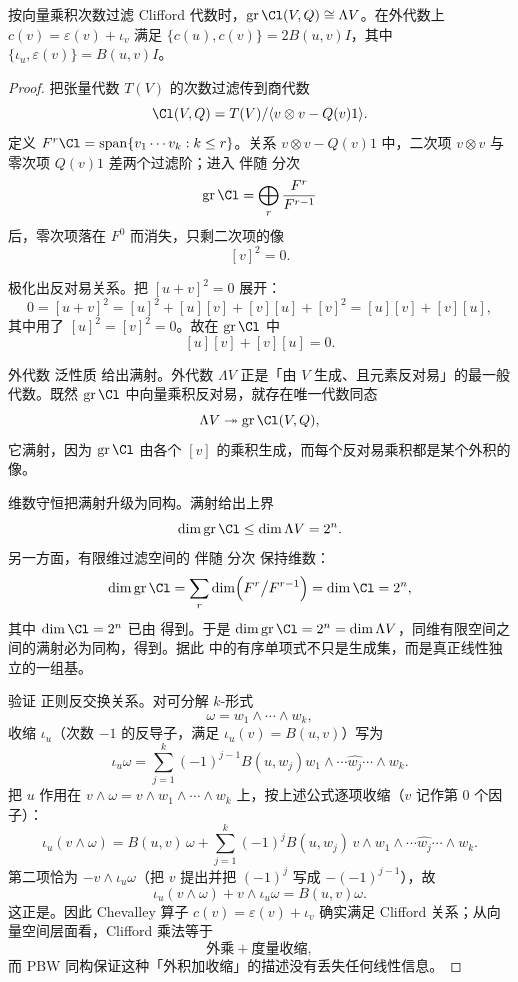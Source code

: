 \begin{theorem}
按向量乘积次数过滤 Clifford 代数时，$\operatorname{gr}\Cl(V,Q)\cong\Lambda V$。在外代数上 $c(v)=\varepsilon(v)+\iota_v$ 满足 $\{c(u),c(v)\}=2B(u,v)I$，其中 $\{\iota_u,\varepsilon(v)\}=B(u,v)I$。
\end{theorem}
\begin{proof}
把张量代数 $T(V)$ 的次数过滤传到商代数
\[
\Cl(V,Q)
=T(V)/\langle v\otimes v-Q(v)1\rangle.
\]
定义 $F^r\Cl=\operatorname{span}\{v_1\cdots v_k:k\le r\}$。关系 $v\otimes v-Q(v)1$ 中，二次项 $v\otimes v$ 与零次项 $Q(v)1$ 差两个过滤阶；进入 伴随 分次
\[
\operatorname{gr}\Cl=\bigoplus_{r}\frac{F^r}{F^{r-1}}
\]
后，零次项落在 $F^0$ 而消失，只剩二次项的像
\[
[v]^2=0.
\]

极化出反对易关系。把 $[u+v]^2=0$ 展开：
\begin{equation*}
  0=[u+v]^2
  =[u]^2+[u][v]+[v][u]+[v]^2
  =[u][v]+[v][u],
\end{equation*}
其中用了 $[u]^2=[v]^2=0$。故在 $\operatorname{gr}\Cl$ 中
\[
[u][v]+[v][u]=0.
\]

外代数 泛性质 给出满射。外代数 $\Lambda V$ 正是「由 $V$ 生成、且元素反对易」的最一般代数。既然 $\operatorname{gr}\Cl$ 中向量乘积反对易，就存在唯一代数同态
\[
\Lambda V\twoheadrightarrow
\operatorname{gr}\Cl(V,Q),
\]
它满射，因为 $\operatorname{gr}\Cl$ 由各个 $[v]$ 的乘积生成，而每个反对易乘积都是某个外积的像。

维数守恒把满射升级为同构。满射给出上界
\[
\dim\operatorname{gr}\Cl
\le\dim\Lambda V=2^n.
\]
另一方面，有限维过滤空间的 伴随 分次 保持维数：
\[
\dim\operatorname{gr}\Cl
=\sum_r\dim\Bigl(F^r\big/F^{r-1}\Bigr)
=\dim\Cl=2^n,
\]
其中 $\dim\Cl=2^n$ 已由 得到。于是 $\dim\operatorname{gr}\Cl=2^n=\dim\Lambda V$，同维有限空间之间的满射必为同构，得到。据此 中的有序单项式不只是生成集，而是真正线性独立的一组基。

验证 正则反交换关系。对可分解 $k$-形式
\[
\omega=w_1\wedge\cdots\wedge w_k,
\]
收缩 $\iota_u$（次数 $-1$ 的反导子，满足 $\iota_u(v)=B(u,v)$）写为
\[
\iota_u\omega
=\sum_{j=1}^k(-1)^{j-1}B(u,w_j)
 w_1\wedge\cdots\widehat{w_j}\cdots\wedge w_k.
\]
把 $u$ 作用在 $v\wedge\omega=v\wedge w_1\wedge\cdots\wedge w_k$ 上，按上述公式逐项收缩（$v$ 记作第 $0$ 个因子）：
\begin{equation*}
 \iota_u(v\wedge\omega)
 =B(u,v)\,\omega
 +\sum_{j=1}^{k}(-1)^{j}B(u,w_j)\,v\wedge w_1\wedge\cdots\widehat{w_j}\cdots\wedge w_k.
\end{equation*}
第二项恰为 $-v\wedge\iota_u\omega$（把 $v$ 提出并把 $(-1)^j$ 写成 $-(-1)^{j-1}$），故
\[
\iota_u(v\wedge\omega)+v\wedge\iota_u\omega
=B(u,v)\omega.
\]
这正是。因此 Chevalley 算子 $c(v)=\varepsilon(v)+\iota_v$ 确实满足 Clifford 关系；从向量空间层面看，Clifford 乘法等于
\[
\text{外乘} + \text{度量收缩},
\]
而 PBW 同构保证这种「外积加收缩」的描述没有丢失任何线性信息。
\end{proof}

